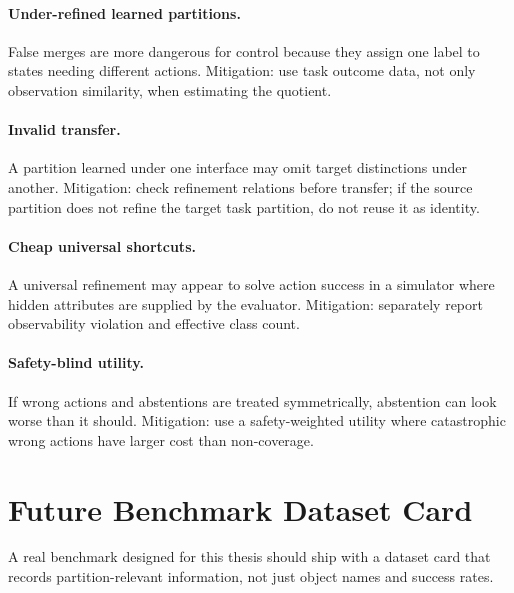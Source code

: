 \documentclass{article}
\begin{document}
\paragraph{Under-refined learned partitions.}
False merges are more dangerous for control because they assign one label to states needing different actions.
Mitigation: use task outcome data, not only observation similarity, when estimating the quotient.

\paragraph{Invalid transfer.}
A partition learned under one interface may omit target distinctions under another.
Mitigation: check refinement relations before transfer; if the source partition does not refine the target task partition, do not reuse it as identity.

\paragraph{Cheap universal shortcuts.}
A universal refinement may appear to solve action success in a simulator where hidden attributes are supplied by the evaluator.
Mitigation: separately report observability violation and effective class count.

\paragraph{Safety-blind utility.}
If wrong actions and abstentions are treated symmetrically, abstention can look worse than it should.
Mitigation: use a safety-weighted utility where catastrophic wrong actions have larger cost than non-coverage.

\section{Future Benchmark Dataset Card}

A real benchmark designed for this thesis should ship with a dataset card that records partition-relevant information, not just object names and success rates.
\end{document}
